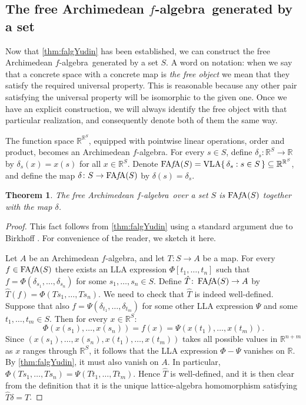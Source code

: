 \documentclass{memo-l}
\newtheorem{thm}[theorem]{Theorem}
\theoremstyle{definition}
\theoremstyle{remark}
\numberwithin{section}{chapter}
\numberwithin{equation}{chapter}
\newcommand\R{\ensuremath{\mathbb{R}}}
\newcommand{\falg}{$f\!$-algebra}
\newcommand{\VLA}{\operatorname{VLA}}
\newcommand{\FAFA}[1]{\operatorname{FA{\it f}\!A}(#1)}
\begin{document}
\subsection{The free Archimedean \falg\ generated by a set}

Now that \cref{thm:falgYudin} has been established, we can construct
the free Archimedean \falg\ generated by a set $S$. A word on
notation: when we say that a concrete space with a concrete map is
\emph{the free object} we mean that they satisfy the required
universal property. This is reasonable because any other pair
satisfying the universal property will be isomorphic to the given one.
Once we have an explicit construction, we will always identify the
free object with that particular realization, and consequently denote
both of them the same way.

The function space $\R^{\R^{S}}$, equipped with pointwise
linear operations, order and product, becomes an Archimedean \falg. For every $s
\in S$, define $\delta _s\colon \R^{S}\to \R$ by $\delta _s(x)=x(s)$
for all $x \in \R^{S}$. Denote $\FAFA S=\VLA \{\, \delta _s : s \in S
\, \} \subseteq \R^{\R^{S}}$, and define the map $\delta \colon S\to
\FAFA S$ by $\delta (s)=\delta _s$.

\begin{thm}\label{thm:FAFA}
    The free Archimedean \falg\ over a set $S$ is $\FAFA S$ together
    with the map $\delta $.
\end{thm}
\begin{proof}
    This fact follows from \cref{thm:falgYudin} using a standard
    argument due to Birkhoff \cite{birkhoff1935}. For
    convenience of the reader, we sketch it here.

    Let $A$ be an Archimedean \falg, and let $T\colon S\to A$ be a
    map. For every $f \in \FAFA S$ there exists an LLA expression
    $\Phi [t_1,\ldots ,t_n]$ such that $f=\Phi (\delta _{s_1},\ldots
    ,\delta _{s_n})$ for some $s_1,\ldots ,s_n \in S$. Define
    $\hat{T}\colon \FAFA S\to A$ by $\hat{T}(f)=\Phi (Ts_1,\ldots
    ,Ts_n)$. We need to check that $\hat{T}$ is indeed well-defined. Suppose
    that also $f=\Psi (\delta _{t_1},\ldots ,\delta _{t_m})$ for some
    other LLA expression $\Psi $ and some $t_1,\ldots ,t_m \in S$.
    Then for every $x \in \R^{S}$:
    \[
    \Phi (x(s_1),\ldots ,x(s_n))=f(x)=\Psi (x(t_1),\ldots ,x(t_m)).
    \]
    Since $(x(s_1),\ldots ,x(s_n),x(t_1),\ldots ,x(t_m))$ takes all
    possible values in $\R^{n+m}$ as $x$ ranges through $\R^{S}$, it
    follows that the LLA expression $\Phi -\Psi $ vanishes on $\R$.
    By \cref{thm:falgYudin}, it must also vanish on $A$. In
    particular, $\Phi (Ts_1,\ldots ,Ts_n)=\Psi (Tt_1,\ldots ,Tt_m)$.
    Hence $\hat{T}$ is well-defined, and
    it is then clear from the definition
    that it is the unique lattice-algebra homomorphism satisfying
    $\hat{T}\delta =T$.
\end{proof}
\end{document}
